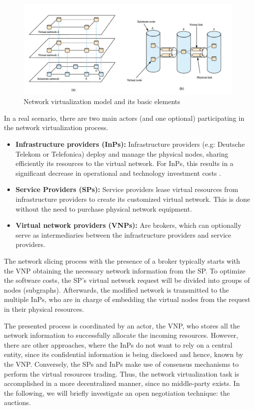 \begin{figure}[bth]
  \includegraphics[width=1\linewidth]{gfx/networkvir}    
  \caption{Network virtualization model and its basic elements \citep{carapinha2009network}}
  \label{fig:networkvir}
\end{figure}

In a real scenario, there are two main actors (and one optional) participating in the network virtualization process.

\begin{itemize}
	
	\item \textbf{Infrastructure providers (InPs):} Infrastructure providers (e.g: Deutsche Telekom or Telefonica) deploy and manage the physical nodes, sharing efficiently its resources to the virtual network. For InPs, this results in a significant decrease in operational and technology investment costs \citep{dietrich2015multi}.
	\item \textbf{Service Providers (SPs):} Service providers lease virtual resources from infrastructure providers to create its customized virtual network. This is done without the need to purchase physical network equipment.
		\item \textbf{Virtual network providers (VNPs):} Are brokers, which can optionally serve as intermediaries between the infrastructure providers and service providers.
\end{itemize}

The network slicing process with the presence of a broker typically starts with the VNP obtaining the necessary network information from the SP. To optimize the software costs, the SP's virtual network request will be divided into groups of nodes (subgraphs). Afterwards, the modified network is transmitted to the multiple InPs, who are in charge of embedding the virtual nodes from the request in their physical resources. 

The presented process is coordinated by an actor, the VNP, who stores all the network information to successfully allocate the incoming resources. However, there are other approaches, where the InPs do not want to rely on a central entity, since its confidential information is being disclosed and hence, known by the VNP. Conversely, the SPs and InPs make use of consensus mechanisms to perform the virtual resources trading. Thus, the network virtualization task is accomplished in a more decentralized manner, since no middle-party exists. In the following, we will briefly investigate an open negotiation technique: the auctions.

